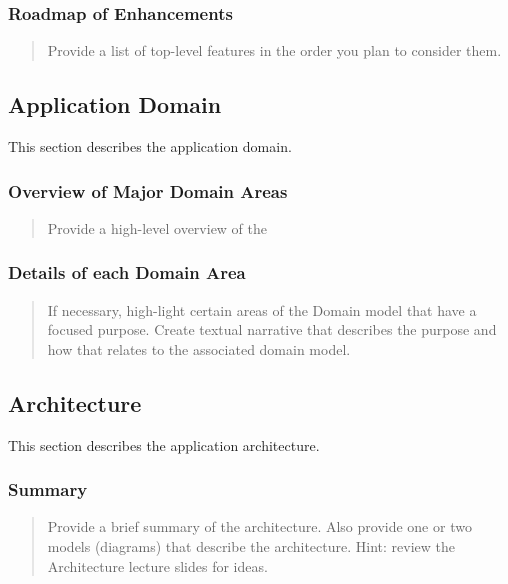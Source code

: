 \documentclass[]{article}
\begin{document}
\subsubsection{Roadmap of Enhancements}\label{roadmap-of-enhancements}

\begin{quote}
Provide a list of top-level features in the order you plan to consider
them.
\end{quote}

\subsection{Application Domain}\label{application-domain}

This section describes the application domain.

\subsubsection{Overview of Major Domain
Areas}\label{overview-of-major-domain-areas}

\begin{quote}
Provide a high-level overview of the
\end{quote}

\subsubsection{Details of each Domain
Area}\label{details-of-each-domain-area}

\begin{quote}
If necessary, high-light certain areas of the Domain model that have a
focused purpose. Create textual narrative that describes the purpose and
how that relates to the associated domain model.
\end{quote}

\subsection{Architecture}\label{architecture}

This section describes the application architecture.

\subsubsection{Summary}\label{summary}

\begin{quote}
Provide a brief summary of the architecture. Also provide one or two
models (diagrams) that describe the architecture. Hint: review the
Architecture lecture slides for ideas.
\end{quote}
\end{document}
